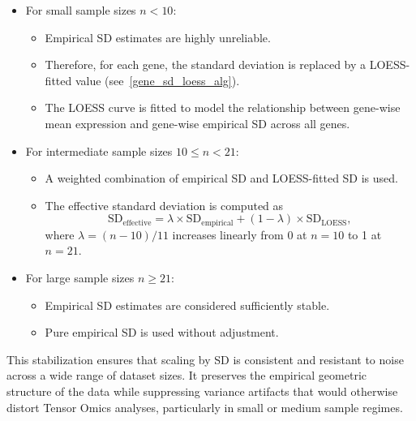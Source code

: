        \begin{itemize}
            \item For small sample sizes \( n < 10 \):
            \begin{itemize}
                \item Empirical SD estimates are highly unreliable.
                \item Therefore, for each gene, the standard deviation is replaced by a
                  LOESS-fitted value (see~\ref{gene_sd_loess_alg}).
                \item The LOESS curve is fitted to model the relationship between
                  gene-wise mean expression and gene-wise empirical SD across all
                  genes.
            \end{itemize}
            
            \item For intermediate sample sizes \( 10 \leq n < 21 \):
            \begin{itemize}
                \item A weighted combination of empirical SD and LOESS-fitted SD is used.
                \item The effective standard deviation is computed as
                      \[
                          \text{SD}_{\text{effective}} = \lambda \times \text{SD}_{\text{empirical}} + (1-\lambda) \times \text{SD}_{\text{LOESS}},
                      \]
                where \( \lambda = (n-10)/11 \) increases linearly from 0 at \( n=10 \) to 1 at \( n=21 \).
            \end{itemize}
            
            \item For large sample sizes \( n \geq 21 \):
            \begin{itemize}
                \item Empirical SD estimates are considered sufficiently stable.
                \item Pure empirical SD is used without adjustment.
            \end{itemize}
        \end{itemize}

        This stabilization ensures that scaling by SD is consistent and resistant to noise across a wide range of dataset sizes.
        It preserves the empirical geometric structure of the data while suppressing variance artifacts that would otherwise distort Tensor Omics analyses, particularly in small or medium sample regimes.

